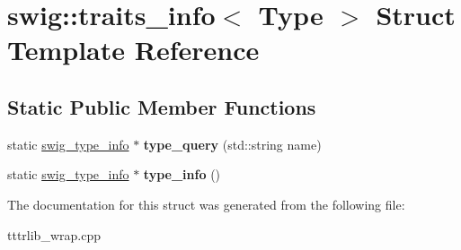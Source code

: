 \hypertarget{structswig_1_1traits__info}{}\section{swig\+:\+:traits\+\_\+info$<$ Type $>$ Struct Template Reference}
\label{structswig_1_1traits__info}
\subsection*{Static Public Member Functions}
\begin{DoxyCompactItemize}
\item 
\mbox{\label{structswig_1_1traits__info_a2616554081419ccfe7f4396f1b8656f9}} 
static \hyperlink{structswig__type__info}{swig\+\_\+type\+\_\+info} $\ast$ {\bfseries type\+\_\+query} (std\+::string name)
\item 
\mbox{\label{structswig_1_1traits__info_acfa11e9ee91b0e0319bf8a3707f71084}} 
static \hyperlink{structswig__type__info}{swig\+\_\+type\+\_\+info} $\ast$ {\bfseries type\+\_\+info} ()
\end{DoxyCompactItemize}


The documentation for this struct was generated from the following file\+:\begin{DoxyCompactItemize}
\item 
tttrlib\+\_\+wrap.\+cpp\end{DoxyCompactItemize}
